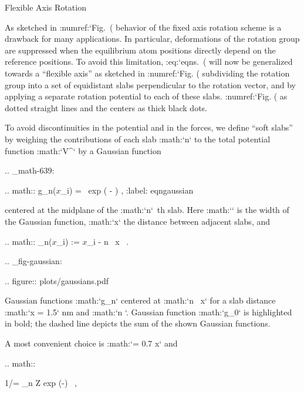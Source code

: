 Flexible Axis Rotation
~~~~~~~~~~~~~~~~~~~~~~

As sketched in :numref:`Fig. (%
behavior of the fixed axis rotation scheme is a drawback for many
applications. In particular, deformations of the rotation group are
suppressed when the equilibrium atom positions directly depend on the
reference positions. To avoid this limitation,
:eq:`eqns. (%
will now be generalized towards a “flexible axis” as sketched in
:numref:`Fig. (%
subdividing the rotation group into a set of equidistant slabs
perpendicular to the rotation vector, and by applying a separate
rotation potential to each of these slabs.
:numref:`Fig. (%
as dotted straight lines and the centers as thick black dots.

To avoid discontinuities in the potential and in the forces, we define
“soft slabs” by weighing the contributions of each slab :math:`n` to the
total potential function :math:`V^` by a Gaussian function

.. _math-639:

.. math:: g_n({\mbox{\boldmath ${x}$}}_i) = \Gamma \ \mbox{exp} \left(
          -  \right) ,
          :label: eqngaussian

centered at the midplane of the :math:`n`\ th slab. Here :math:`\sigma`
is the width of the Gaussian function, :math:`\Delta x` the distance
between adjacent slabs, and

.. math:: \beta_n({\mbox{\boldmath ${x}$}}_i) := {\mbox{\boldmath ${x}$}}_i \cdot {} - n \, \Delta x \, .

.. _fig-gaussian:

.. figure:: plots/gaussians.pdf

   Gaussian functions :math:`g_n` centered at :math:`n \, \Delta x` for
   a slab distance :math:`\Delta x = 1.5` nm and :math:`n `.
   Gaussian function :math:`g_0` is highlighted in bold; the dashed line
   depicts the sum of the shown Gaussian functions.

A most convenient choice is :math:`\sigma = 0.7 \Delta x` and

.. math::

   1/\Gamma = \sum_{n \in Z}
   \mbox{exp}
   \left(-\right)
    \, ,

